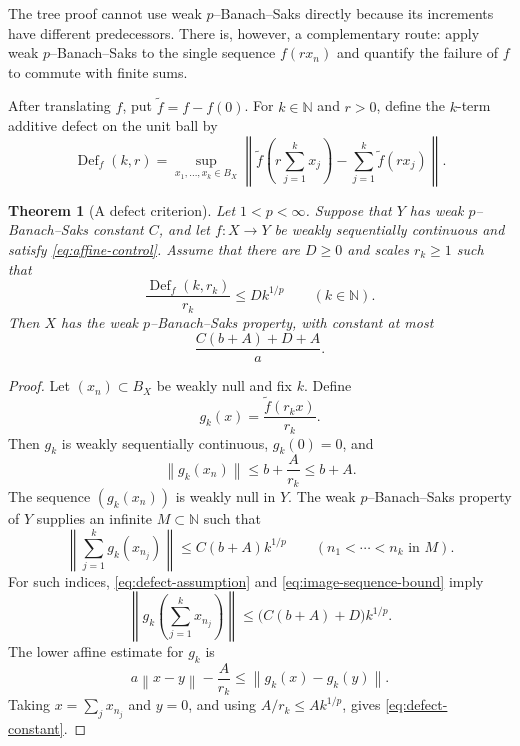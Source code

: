 \documentclass[11pt]{amsart}
\newtheorem{theorem}{Theorem}[section]
\theoremstyle{definition}
\theoremstyle{remark}
\newcommand{\N}{\mathbb N}
\newcommand{\Def}{\mathop{\mathrm{Def}}}
\newcommand{\norm}[1]{\left\lVert #1\right\rVert}
\begin{document}
The tree proof cannot use weak $p$--Banach--Saks directly because its increments have different predecessors.  There is, however, a complementary route: apply weak $p$--Banach--Saks to the single sequence $f(r x_n)$ and quantify the failure of $f$ to commute with finite sums.

After translating $f$, put $\widetilde f=f-f(0)$.  For $k\in\N$ and $r>0$, define the $k$-term additive defect on the unit ball by
\begin{equation}\label{eq:defect-definition}
 \Def_f(k,r)=
 \sup_{x_1,\ldots,x_k\in B_X}
 \norm{
  \widetilde f\!\left(r\sum_{j=1}^k x_j\right)
  -\sum_{j=1}^k\widetilde f(rx_j)
 }.
\end{equation}

\begin{theorem}[A defect criterion]\label{thm:defect-criterion}
Let $1<p<\infty$.  Suppose that $Y$ has weak $p$--Banach--Saks constant $C$, and let $f:X\to Y$ be weakly sequentially continuous and satisfy \eqref{eq:affine-control}.  Assume that there are $D\ge0$ and scales $r_k\ge1$ such that
\begin{equation}\label{eq:defect-assumption}
 \frac{\Def_f(k,r_k)}{r_k}\le Dk^{1/p}
 \qquad(k\in\N).
\end{equation}
Then $X$ has the weak $p$--Banach--Saks property, with constant at most
\begin{equation}\label{eq:defect-constant}
 \frac{C(b+A)+D+A}{a}.
\end{equation}
\end{theorem}

\begin{proof}
Let $(x_n)\subset B_X$ be weakly null and fix $k$.  Define
\[
 g_k(x)=\frac{\widetilde f(r_kx)}{r_k}.
\]
Then $g_k$ is weakly sequentially continuous, $g_k(0)=0$, and
\[
 \norm{g_k(x_n)}\le b+\frac{A}{r_k}\le b+A.
\]
The sequence $(g_k(x_n))$ is weakly null in $Y$.  The weak $p$--Banach--Saks property of $Y$ supplies an infinite $M\subset\N$ such that
\begin{equation}\label{eq:image-sequence-bound}
 \norm{\sum_{j=1}^k g_k(x_{n_j})}
 \le C(b+A)k^{1/p}
 \qquad(n_1<\cdots<n_k\text{ in }M).
\end{equation}
For such indices, \eqref{eq:defect-assumption} and \eqref{eq:image-sequence-bound} imply
\[
 \norm{g_k(\sum_{j=1}^k x_{n_j})}
 \le \bigl(C(b+A)+D\bigr)k^{1/p}.
\]
The lower affine estimate for $g_k$ is
\[
 a\norm{x-y}-\frac{A}{r_k}
 \le\norm{g_k(x)-g_k(y)}.
\]
Taking $x=\sum_jx_{n_j}$ and $y=0$, and using $A/r_k\le A k^{1/p}$, gives \eqref{eq:defect-constant}.
\end{proof}
\end{document}
